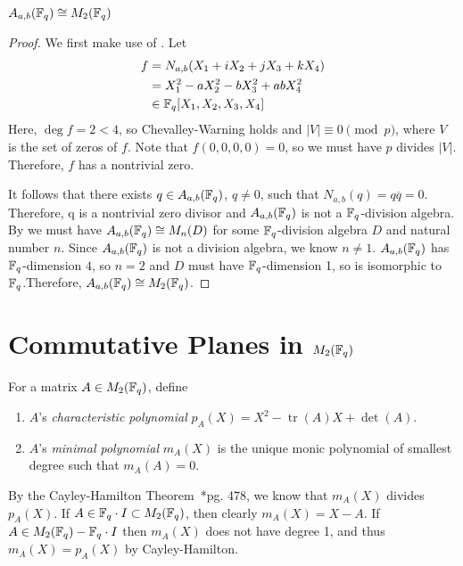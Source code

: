 \documentclass{amsart}
\begin{document}
\begin{theorem}\label{gen-quat-finite}
    $A_{a,b}(\protect\mathbb{F}_q) \cong M_2(\protect\mathbb{F}_q)$ 
\end{theorem}
\begin{proof}
    We first make use of . Let
    \begin{align*}
        f &= N_{a,b}(X_1 + iX_2 + jX_3 + kX_4) \\
            &= X_1^2 -aX_2^2 -bX_3^2 + abX_4^2 \\
            &\in \protect\mathbb{F}_q[X_1, X_2, X_3, X_4]
    \end{align*}
    Here, $\deg f = 2 < 4$, so Chevalley-Warning holds and $|V| \equiv 0 \pmod{p}$, where $V$ is the set of zeros of $f$. Note that $f(0,0,0,0) = 0$, so we must have $p$ divides $|V|$. Therefore, $f$ has a nontrivial zero.

    It follows that there exists $q \in A_{a,b}(\protect\mathbb{F}_q)$, $q \neq 0$, such that $N_{a,b}(q) = q \overline{q} = 0$. Therefore, q is a nontrivial zero divisor and $A_{a,b}(\protect\mathbb{F}_q)$ is not a $\protect\mathbb{F}_q$-division algebra. By  we must have $A_{a,b}(\protect\mathbb{F}_q) \cong M_n(D)$ for some $\protect\mathbb{F}_q$-division algebra $D$ and natural number $n$. Since $A_{a,b}(\protect\mathbb{F}_q)$ is not a division algebra, we know $n\neq1$. $A_{a,b}(\protect\mathbb{F}_q)$ has $\protect\mathbb{F}_q$-dimension $4$, so $n = 2$ and $D$ must have $\protect\mathbb{F}_q$-dimension 1, so is isomorphic to $\protect\mathbb{F}_q$.Therefore, $A_{a,b}(\protect\mathbb{F}_q) \cong M_2(\protect\mathbb{F}_q)$. 
\end{proof}

\section{Commutative Planes in $M_2(\protect\mathbb{F}_q)$}
    \begin{defn}
        For a matrix $A \in M_2(\protect\mathbb{F}_q)$, define
        \begin{enumerate}
            \item $A$'s {\it characteristic polynomial} $p_A(X) = X^2 -\operatorname{tr}(A)X + \det(A)$.
            \item $A$'s {\it minimal polynomial} $m_A(X)$ is the unique monic polynomial of smallest degree such that $m_A(A) = 0$.
        \end{enumerate}
    \end{defn}

    By the Cayley-Hamilton Theorem~\cite{DandF}*{pg. 478}, we know that $m_A(X)$ divides $p_A(X)$. If $A \in \protect\mathbb{F}_q\cdot I\subset M_2(\protect\mathbb{F}_q)$, then clearly $m_A(X) = X - A$. If $A \in M_2(\protect\mathbb{F}_q)-\protect\mathbb{F}_q\cdot I$ then $m_A(X)$ does not have degree 1, and thus $m_A(X) = p_A(X)$  by Cayley-Hamilton. 
    
\end{document}
